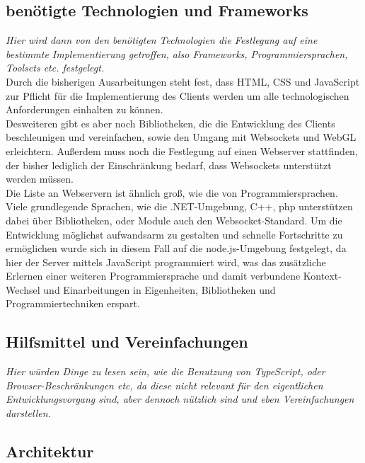 \subsection{benötigte Technologien und Frameworks}
\label{subsec:Technologien}

\emph{Hier wird dann von den benötigten Technologien die Festlegung auf eine bestimmte Implementierung getroffen, also Frameworks, Programmiersprachen, Toolsets etc. festgelegt.}\\
Durch die bisherigen Ausarbeitungen steht fest, dass HTML, CSS und JavaScript zur Pflicht für die Implementierung des Clients werden um alle technologischen Anforderungen einhalten zu können.\\
Desweiteren gibt es aber noch Bibliotheken, die die Entwicklung des Clients beschleunigen und vereinfachen, sowie den Umgang mit Websockets und WebGL erleichtern. Außerdem muss noch die Festlegung auf einen Webserver stattfinden, der bisher lediglich der Einschränkung bedarf, dass Websockets unterstützt werden müssen.\\
Die Liste an Webservern ist ähnlich groß, wie die von Programmiersprachen. Viele grundlegende Sprachen, wie die .NET-Umgebung, C++, php \ua unterstützen dabei über Bibliotheken, oder Module auch den Websocket-Standard. Um die Entwicklung möglichst aufwandsarm zu gestalten und schnelle Fortschritte zu ermöglichen wurde sich in diesem Fall auf die node.js-Umgebung festgelegt, da hier der Server mittels JavaScript programmiert wird, was das zusätzliche Erlernen einer weiteren Programmiersprache und damit verbundene Kontext-Wechsel und Einarbeitungen in Eigenheiten, Bibliotheken und Programmiertechniken erspart.

\subsection{Hilfsmittel und Vereinfachungen}
\label{subsec:Hilfsmittel}

\emph{Hier würden Dinge zu lesen sein, wie die Benutzung von TypeScript, oder Browser-Beschränkungen etc, da diese nicht relevant für den eigentlichen Entwicklungsvorgang sind, aber dennoch nützlich sind und eben Vereinfachungen darstellen.}

\subsection{Architektur}
\label{subsec:Architektur}

